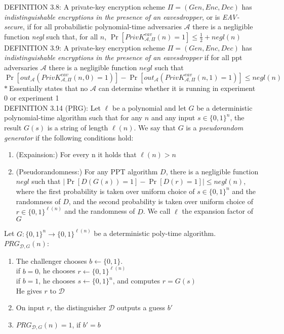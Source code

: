 DEFINITION 3.8: A private-key encryption scheme $\Pi = (Gen, Enc, Dec)$
 has \emph{indistinguishable encryptions in the presence of an eavesdropper}, or 
 is \emph{EAV-secure}, if for all probabilistic polynomial-time adversaries $\mathcal{A}$
 there is a negligible function \emph{negl} such that, for all $n$,
 $\Pr[PrivK^{eav}_{\mathcal{A},\Pi}(n)=1]\le\frac{1}{2}+negl(n)$\\

DEFINITION 3.9: A private-key encryption scheme $\Pi = (Gen, Enc, Dec)$
has \emph{indistinguishable encryptions in the presence of an eavesdropper}
if for all ppt adversaries $\mathcal{A}$ there is a negligible function $negl$ such that
$\Pr[out_{\mathcal{A}}(PrivK^{eav}_{\mathcal{A},\Pi}(n,0)=1)]
-\Pr[out_{\mathcal{A}}(PrivK^{eav}_{\mathcal{A},\Pi}(n,1)=1)]
\le negl(n)$\\
$\ast\ $Essentially states that no $\mathcal{A}$ can determine whether it is running in
experiment 0 or experiment 1\\

DEFINITION 3.14 (PRG): Let $\ell$ be a polynomial and let $G$ be a deterministic 
polynomial-time algorithm such that for any $n$ and any input $s \in \{0,1\}^n$, 
the result $G(s)$ is a string of length $\ell(n)$. We say that $G$ is 
a \emph{pseudorandom generator} if the following conditions hold:
\begin{enumerate}
    \item (Expainsion:) For every n it holds that $\ell(n)>n$
    \item (Pseudorandomness:) For any PPT algorithm $D$, there is a negligible
     function $negl$ such that $|\Pr[D(G(s))=1]-\Pr[D(r)=1]|\le negl(n)$,
     where the first probability is taken over uniform choice of
     $s \in \{0, 1\}^n$ and the randomness of $D$, and the second probability
      is taken over uniform choice of $r \in \{0, 1\}^{\ell(n)}$ and the randomness
       of $D$. We call $\ell$ the expansion factor of $G$
\end{enumerate}
Let $G:\{0,1\}^n\rightarrow \{0,1\}^{\ell(n)}$ be a deterministic poly-time
algorithm.\\
$PRG_{\mathcal{D},G}(n)$:
\begin{enumerate}
  \item The challenger chooses $b\leftarrow\{0,1\}$.\\
  if $b=0$, he chooses $r\leftarrow\{0,1\}^{\ell(n)}$\\
  if $b=1$, he chooses $s\leftarrow\{0,1\}^n$, and computes $r=G(s)$\\
  He gives $r$ to $\mathcal{D}$
  \item On input $r$, the distinguisher $\mathcal{D}$ outputs a guess $b'$
  \item $PRG_{\mathcal{D},G}(n)=1$, if $b'=b$
\end{enumerate}

